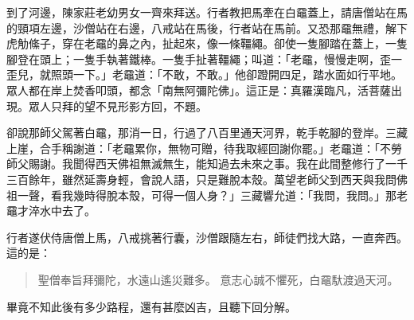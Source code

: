 到了河邊，陳家莊老幼男女一齊來拜送。行者教把馬牽在白黿蓋上，請唐僧站在馬的頸項左邊，沙僧站在右邊，八戒站在馬後，行者站在馬前。又恐那黿無禮，解下虎觔絛子，穿在老黿的鼻之內，扯起來，像一條韁繩。卻使一隻腳踏在蓋上，一隻腳登在頭上；一隻手執著鐵棒。一隻手扯著韁繩；叫道：「老黿，慢慢走啊，歪一歪兒，就照頭一下。」老黿道：「不敢，不敢。」他卻蹬開四足，踏水面如行平地。眾人都在岸上焚香叩頭，都念「南無阿彌陀佛」。這正是：真羅漢臨凡，活菩薩出現。眾人只拜的望不見形影方回，不題。

卻說那師父駕著白黿，那消一日，行過了八百里通天河界，乾手乾腳的登岸。三藏上崖，合手稱謝道：「老黿累你，無物可贈，待我取經回謝你罷。」老黿道：「不勞師父賜謝。我聞得西天佛祖無滅無生，能知過去未來之事。我在此間整修行了一千三百餘年，雖然延壽身輕，會說人語，只是難脫本殼。萬望老師父到西天與我問佛祖一聲，看我幾時得脫本殼，可得一個人身？」三藏響允道：「我問，我問。」那老黿才淬水中去了。

行者遂伏侍唐僧上馬，八戒挑著行囊，沙僧跟隨左右，師徒們找大路，一直奔西。這的是：
\begin{quote}
聖僧奉旨拜彌陀，水遠山遙災難多。
意志心誠不懼死，白黿馱渡過天河。
\end{quote}

畢竟不知此後有多少路程，還有甚麼凶吉，且聽下回分解。
